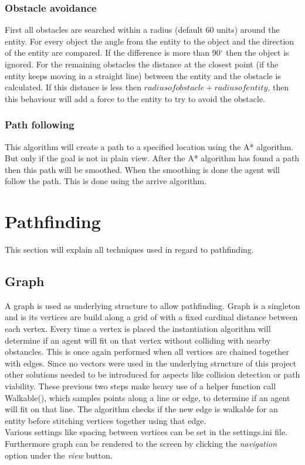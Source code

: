 \documentclass[10pt]{extarticle} %
\begin{document}
  \subsubsection {Obstacle avoidance}
  First all obstacles are searched within a radius (default 60 units) around the entity. For every object the angle from the entity to the object and the direction of the entity are compared. If the difference is more than 90$^{\circ}$ then the object is ignored. For the remaining obstacles the distance at the closest point (if the entity keeps moving in a straight line) between the entity and the obstacle is calculated. If this distance is less then \(radius of obstacle + radius of entity\), then this behaviour will add a force to the entity to try to avoid the obstacle.
  \subsubsection {Path following}
   This algorithm will create a path to a specified location using the A* algorithm. But only if the goal is not in plain view. After the A* algorithm has found a path then this path will be smoothed. When the smoothing is done the agent will follow the path. This is done using the arrive algorithm. 
   \newpage
   
   \section {Pathfinding}
This section will explain all techniques used in regard to pathfinding.
   \subsection {Graph}
  A graph is used as underlying structure to allow pathfinding. Graph is a singleton and is its vertices are build along a grid of with a fixed cardinal distance between each vertex. Every time a vertex is placed the instantiation algorithm will determine if an agent will fit on that vertex without colliding with nearby obstancles. This is once again performed when all vertices are chained together with edges. Since no vectors were used in the underlying structure of this project other solutions needed to be introduced for aspects like collision detection or path viability. These previous two steps make heavy use of a helper function call Walkable(), which samples points along a line or edge, to determine if an agent will fit on that line\cite{tmrp}. The algorithm checks if the new edge is walkable for an entity before stitching vertices together using that edge.\\
   Various settings like spacing between vertices can be set in the settings.ini file. Furthermore graph can be rendered to the screen by clicking the \emph{navigation} option under the \emph{view} button.
\end{document}
